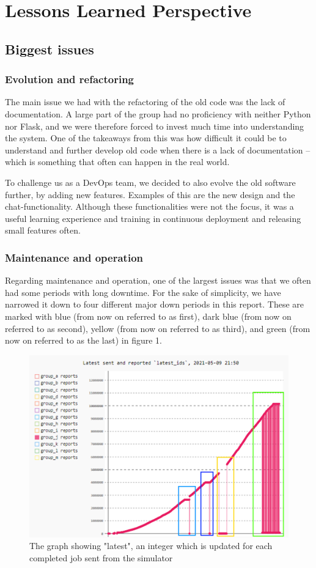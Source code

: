 \section{Lessons Learned Perspective}
\subsection{Biggest issues}
\subsubsection{Evolution and refactoring}
The main issue we had with the refactoring of the old code was the lack of documentation. A large part of the group had no proficiency with neither Python nor Flask, and we were therefore forced to invest much time into understanding the system. One of the takeaways from this was how difficult it could be to understand and further develop old code when there is a lack of documentation – which is something that often can happen in the real world.

To challenge us as a DevOps team, we decided to also evolve the old software further, by adding new features. Examples of this are the new design and the chat-functionality. Although these functionalities were not the focus, it was a useful learning experience and training in continuous deployment and releasing small features often.

\subsubsection{Maintenance and operation}

Regarding maintenance and operation, one of the largest issues was that we often had some periods with long downtime. For the sake of simplicity, we have narrowed it down to four different major down periods in this report. These are marked with blue (from now on referred to as first), dark blue (from now on referred to as second), yellow (from now on referred to as third), and green (from now on referred to as the last) in figure 1. 

\begin{figure}[h!]
    \centering
    \includegraphics[scale=0.7]{images/downperiodes.png}
    \caption{The graph showing "latest", an integer which is updated for each completed job sent from the simulator }
\end{figure}
 
